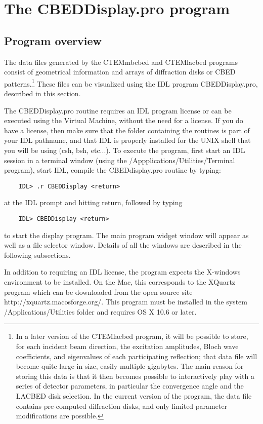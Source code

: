 \documentclass[DIV=calc, paper=letter, fontsize=11pt]{scrartcl}	 %
\begin{document}
\section{The \protect\textsf{CBEDDisplay.pro} program\label{sec:idl}}


\subsection{Program overview\label{sec:idloverview}}
The data files generated by the \textsf{CTEMmbcbed} and \textsf{CTEMlacbed} programs consist of geometrical information and arrays of diffraction 
disks or CBED patterns.\footnote{In a later version of the \textsf{CTEMlacbed} program, it will be possible to store, for each incident beam direction, 
the excitation amplitudes, Bloch wave coefficients, and eigenvalues of each participating reflection; 
that data file will become quite large in size, easily multiple gigabytes.
The main reason for storing this data is that it then becomes possible to interactively play with a series of detector parameters,
in particular the convergence angle and the LACBED disk selection.  In the current version of the program, the data file contains
pre-computed diffraction disks, and only limited parameter modifications are possible.}  These files can be visualized using the IDL program
\textsf{CBEDDisplay.pro}, described in this section.

The \textsf{CBEDDisplay.pro} routine requires an IDL program license or can be executed using the Virtual Machine, without the need for a license. 
If you do have a license, then make sure that the folder containing the routines is part of your IDL pathname,
and that IDL is properly installed for the UNIX shell that you will be using (csh, bsh, etc...).
To execute the program, first start an IDL session in a terminal window (using the /Appplications/Utilities/Terminal program), 
start IDL, compile the \textsf{CBEDdisplay.pro} routine by typing:
\begin{verbatim}
	IDL> .r CBEDDisplay <return>
\end{verbatim}
at the IDL prompt and hitting return, followed by typing 
\begin{verbatim}
	IDL> CBEDDisplay <return>
\end{verbatim}
to start the display program.  The main program widget window will appear as well as a file selector window.  
Details of all the windows are described in the following subsections.

In addition to requiring an IDL license, the program expects the X-windows environment to be installed.  On the Mac, this corresponds
to the \textsf{XQuartz} program which can be downloaded from the open source site \textsf{http://xquartz.macosforge.org/}.  This program
must be installed in the system /Applications/Utilities folder and requires OS X 10.6 or later.
\end{document}
